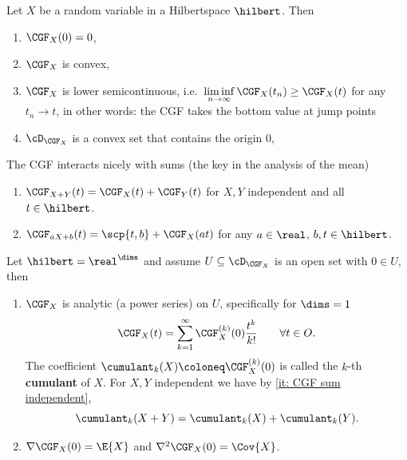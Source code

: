 \begin{lemma}
    \label{lem: properties of CGF}
    Let \(X\) be a random variable in a Hilbertspace \(\hilbert\). Then
    \begin{enumerate}[label=\normalfont{(\arabic*)}, noitemsep]
        \item\label{it: CGF(0)=0} \(\CGF_X(0) = 0\),
        \item\label{it: CGF convex} \(\CGF_X\) is convex,
        \item\label{it: CGF lower semicontinuous} \(\CGF_X\) is lower semicontinuous, i.e.\ \(\liminf\limits_{n\to\infty} \CGF_X(t_n) \ge \CGF_X(t)\) for any \(t_n\to t\),
        in other words: the CGF takes the bottom value at jump points

        \item\label{it: CGF effective domain is convex} \(\cD_{\CGF_X}\) is a convex set that contains the origin \(0\),
    \end{enumerate} 
    The CGF interacts nicely with sums (the key in the analysis of the mean)
    \begin{enumerate}[label=\normalfont{(\arabic*)}, noitemsep, resume]
        \item\label{it: CGF sum independent} \(\CGF_{X+Y}(t) = \CGF_X(t) + \CGF_Y(t)\) for \(X,Y\) independent and all \(t\in \hilbert\).
        \item\label{it: CGF affine} \(\CGF_{aX + b}(t) = \scp{t, b} + \CGF_X(a t)\)
        for any \(a\in \real\), \(b, t\in \hilbert\).
    \end{enumerate}
    Let \(\hilbert=\real^\dims\) and assume \(U \subseteq \cD_{\CGF_X}\) is an open
    set with \(0\in U\), then
    \begin{enumerate}[label=\normalfont{(\arabic*)}, noitemsep, resume]
        \item\label{it: CGF analytic} \(\CGF_X\) is analytic (a power series) on \(U\), specifically for \(\dims=1\)
        \[
            \CGF_X(t)
            = \sum_{k=1}^\infty \CGF_X^{(k)}(0)\frac{t^k}{k!}
            \qquad \forall t\in O.
        \]
        The coefficient \(\cumulant_k(X) \coloneq \CGF_X^{(k)}(0)\) is called the \(k\)-th \textbf{cumulant} of \(X\).
        For \(X,Y\) independent we have by \ref{it: CGF sum independent},
        \[
            \cumulant_k(X+Y) = \cumulant_k(X) + \cumulant_k(Y).
        \]
        \item\label{it: CGF gradient and Hessian} \(\nabla \CGF_X(0) = \E{X}\) and \(\nabla^2\CGF_X(0) = \Cov{X}\).
    \end{enumerate}
\end{lemma}
